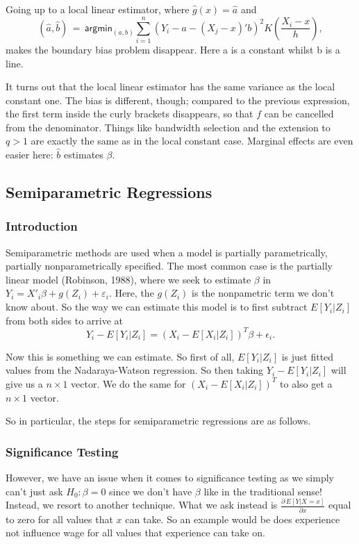 \documentclass[twoside]{article}
\begin{document}
Going up to a local linear estimator, where $\hat{g}\left(x\right)=\hat{a}$ and \[\left(\hat{a},\hat{b}\right)\,=\,\textsf{argmin}_{\left(a,b\right)}\sum_{i=1}^n\left(Y_i-a-\left(X_j-x\right)'b\right)^2K\left(\frac{X_i-x}{h}\right),\] makes the boundary bias problem disappear. Here a is a constant whilst b is a line.

It turns out that the local linear estimator has the same variance as the local constant one. The bias is different, though; compared to the previous expression, the first term inside the curly brackets disappears, so that $f$ can be cancelled from the denominator. Things like bandwidth selection and the extension to $q>1$ are exactly the same as in the local constant case. Marginal effects are even easier here: $\hat{b}$ estimates $\beta$.


\subsection{Semiparametric Regressions}
\subsubsection{Introduction}
Semiparametric methods are used when a model is partially parametrically, partially nonparametrically specified. The most common case is the partially linear model (Robinson, 1988), where we seek to estimate $\beta$ in $Y_i=X'_i\beta+g\left(Z_i\right)+\varepsilon_i$. Here, the $g(Z_i)$ is the nonpametric term we don't know about. So the way we can estimate this model is to first subtract $E[Y_i|Z_i]$ from both sides to arrive at
$$
Y_i - E[Y_i|Z_i] = (X_i - E[X_i|Z_i])^T\beta + \epsilon_i.
$$

Now this is something we can estimate. So first of all, $E[Y_i|Z_i]$ is just fitted values from the Nadaraya-Watson regression. So then taking $Y_i - E[Y_i|Z_i]$ will give us a $n \times 1$ vector. We do the same for $(X_i - E[X_i|Z_i])^T$ to also get a $n \times 1$ vector. 

So in particular, the steps for semiparametric regressions are as follows.

\subsubsection{Significance Testing}
However, we have an issue when it comes to significance testing as we simply can't just ask $H_0: \beta = 0$ since we don't have $\beta$ like in the traditional sense! Instead, we resort to another technique. What we ask instead is $\frac{\partial\,E\left[Y\left|X=x\right.\right]}{\partial x}$ equal to zero for all values that $x$ can take. So an example would be does experience not influence wage for all values that experience can take on. 
\end{document}
